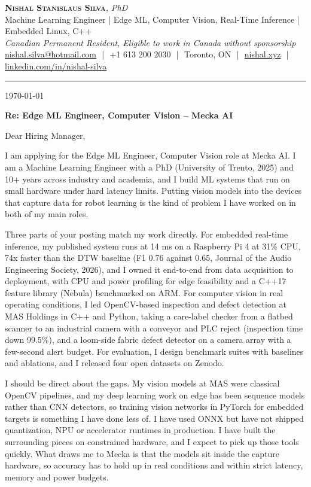 \documentclass[11pt]{article}
\makeatletter
\newcommand{\clName}{Nishal Stanislaus Silva}
\newcommand{\clEmail}{nishal.silva@hotmail.com}
\newcommand{\clPhone}{+1 613 200 2030}
\newcommand{\clCity}{Toronto, ON}
\newcommand{\clSite}{https://nishal.xyz}
\newcommand{\clLinkedIn}{https://www.linkedin.com/in/nishal-silva}
\newcommand{\clStatus}{Canadian Permanent Resident, Eligible to work in Canada without sponsorship}
\newcommand{\clTagline}{Machine Learning Engineer | Edge ML, Computer Vision, Real-Time Inference | Embedded Linux, C++}
\newcommand{\clRole}{Edge ML Engineer, Computer Vision}
\newcommand{\clCompany}{Mecka AI}
\newcommand{\clAddressee}{Dear Hiring Manager,}
\makeatother
\begin{document}
\pagestyle{empty}

\begin{center}
    {\LARGE \scshape \textbf{\clName}}{\large \textit{, PhD}}
    \\[1pt]
    {\small \clTagline}
    \\[1pt]
    {\footnotesize\textit{\clStatus}}
    \\[1pt]
    {\small
    \href{mailto:\clEmail}{\clEmail}
    \,\,|\,\, \clPhone
    \,\,|\,\, \clCity
    \,\,|\,\, \href{\clSite}{nishal.xyz}
    \,\,|\,\, \href{\clLinkedIn}{linkedin.com/in/nishal-silva}}
\end{center}

\rule{\linewidth}{0.4pt}\vspace{0.6em}

\today

\textbf{Re: \clRole{} -- \clCompany{}}

\clAddressee

I am applying for the Edge ML Engineer, Computer Vision role at Mecka AI. I am a Machine Learning Engineer with a PhD (University of Trento, 2025) and 10+ years across industry and academia, and I build ML systems that run on small hardware under hard latency limits. Putting vision models into the devices that capture data for robot learning is the kind of problem I have worked on in both of my main roles.

Three parts of your posting match my work directly. For embedded real-time inference, my published system runs at 14 ms on a Raspberry Pi 4 at 31\% CPU, 74x faster than the DTW baseline (F1 0.76 against 0.65, Journal of the Audio Engineering Society, 2026), and I owned it end-to-end from data acquisition to deployment, with CPU and power profiling for edge feasibility and a C++17 feature library (Nebula) benchmarked on ARM. For computer vision in real operating conditions, I led OpenCV-based inspection and defect detection at MAS Holdings in C++ and Python, taking a care-label checker from a flatbed scanner to an industrial camera with a conveyor and PLC reject (inspection time down 99.5\%), and a loom-side fabric defect detector on a camera array with a few-second alert budget. For evaluation, I design benchmark suites with baselines and ablations, and I released four open datasets on Zenodo.

I should be direct about the gaps. My vision models at MAS were classical OpenCV pipelines, and my deep learning work on edge has been sequence models rather than CNN detectors, so training vision networks in PyTorch for embedded targets is something I have done less of. I have used ONNX but have not shipped quantization, NPU or accelerator runtimes in production. I have built the surrounding pieces on constrained hardware, and I expect to pick up those tools quickly. What draws me to Mecka is that the models sit inside the capture hardware, so accuracy has to hold up in real conditions and within strict latency, memory and power budgets.
\end{document}
